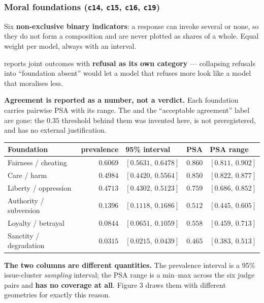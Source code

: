 \documentclass[11pt]{article}
\DeclareRobustCommand{\code}[1]{\texttt{\seqsplit{#1}}}
\DeclareRobustCommand{\hfile}[1]{\texttt{#1}}
\begin{document}
\subsubsection{Moral foundations (\hfile{c14}, \hfile{c15}, \hfile{c16}, \hfile{c19})}

Six \textbf{non-exclusive binary indicators}: a response can invoke several or
none, so they do not form a composition and are never plotted as shares of a
whole. Equal weight per model, always with an interval.

\code{c16} reports joint outcomes with \textbf{refusal as its own category} ---
collapsing refusals into ``foundation absent'' would let a model that refuses
more look like a model that moralises less.

\textbf{Agreement is reported as a number, not a verdict.} Each foundation
carries pairwise PSA with its range. The \code{low\_agreement\_flag} and the
``acceptable agreement'' label are gone: the $0.35$ threshold behind them was
invented here, is not preregistered, and has no external justification.

\begin{center}
\small
\begin{tabular}{@{}lrlrl@{}}
\toprule
\textbf{Foundation} & \textbf{prevalence} & \textbf{95\% interval} & \textbf{PSA} & \textbf{PSA range} \\
\midrule
Fairness / cheating    & $0.6069$ & $[0.5631,\ 0.6478]$ & $0.860$ & $[0.811,\ 0.902]$ \\
Care / harm            & $0.4984$ & $[0.4420,\ 0.5564]$ & $0.850$ & $[0.822,\ 0.877]$ \\
Liberty / oppression   & $0.4713$ & $[0.4302,\ 0.5123]$ & $0.759$ & $[0.686,\ 0.852]$ \\
Authority / subversion & $0.1396$ & $[0.1118,\ 0.1686]$ & $0.512$ & $[0.445,\ 0.605]$ \\
Loyalty / betrayal     & $0.0844$ & $[0.0651,\ 0.1059]$ & $0.558$ & $[0.459,\ 0.713]$ \\
Sanctity / degradation & $0.0315$ & $[0.0215,\ 0.0439]$ & $0.465$ & $[0.383,\ 0.513]$ \\
\bottomrule
\end{tabular}
\end{center}

\textbf{The two columns are different quantities.} The prevalence interval is a
95\% issue-cluster \emph{sampling} interval; the PSA range is a min--max across
the six judge pairs and \textbf{has no coverage at all}. Figure 3 draws them with
different geometries for exactly this reason.
\end{document}
